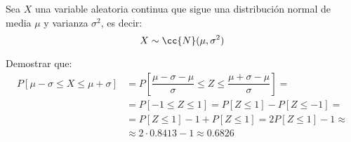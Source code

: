 \begin{ejercicio}
    Sea $X$ una variable aleatoria continua que sigue una distribución normal de media $\mu$ y varianza $\sigma^2$, es decir:
    \begin{equation*}
        X\sim \cc{N}(\mu,\sigma^2)
    \end{equation*}

    Demostrar que:
    \begin{align*}
        P[\mu-\sigma\leq X\leq \mu+\sigma]
        &= P\left[\dfrac{\mu-\sigma-\mu}{\sigma} \leq Z\leq
        \dfrac{\mu+\sigma-\mu}{\sigma}\right]
        =\\&= P[-1\leq Z\leq 1]
        = P[Z\leq 1] -P[Z\leq -1]
        =\\&= P[Z\leq 1] -1+P[Z\leq 1]
        = 2P[Z\leq 1] -1 \approx\\&\approx 2\cdot 0.8413-1
        \approx 0.6826
    \end{align*}
    
\end{ejercicio}